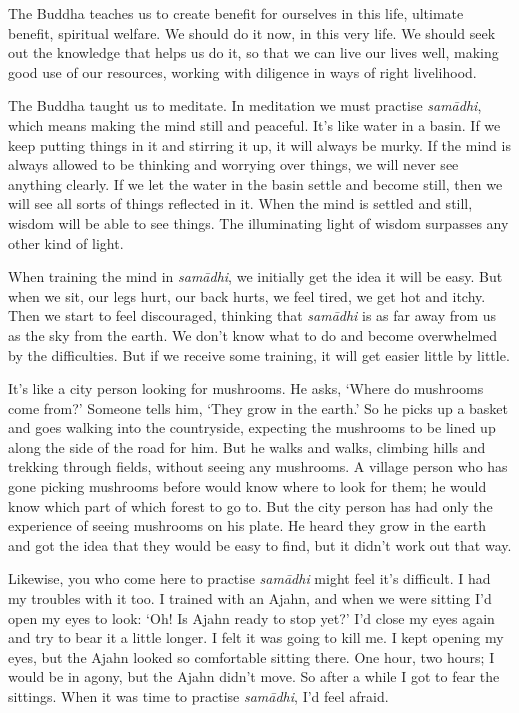The Buddha teaches us to create benefit for ourselves in this life,
ultimate benefit, spiritual welfare. We should do it now, in this very
life. We should seek out the knowledge that helps us do it, so that we
can live our lives well, making good use of our resources, working with
diligence in ways of right livelihood.

The Buddha taught us to meditate. In meditation we must practise
\emph{samādhi}, which means making the mind still and peaceful. It's
like water in a basin. If we keep putting things in it and stirring it
up, it will always be murky. If the mind is always allowed to be
thinking and worrying over things, we will never see anything clearly.
If we let the water in the basin settle and become still, then we will
see all sorts of things reflected in it. When the mind is settled and
still, wisdom will be able to see things. The illuminating light of
wisdom surpasses any other kind of light.

When training the mind in \emph{samādhi}, we initially get the idea it
will be easy. But when we sit, our legs hurt, our back hurts, we feel
tired, we get hot and itchy. Then we start to feel discouraged, thinking
that \emph{samādhi} is as far away from us as the sky from the earth. We
don't know what to do and become overwhelmed by the difficulties. But if
we receive some training, it will get easier little by little.

It's like a city person looking for mushrooms. He asks, `Where do
mushrooms come from?' Someone tells him, `They grow in the earth.' So he
picks up a basket and goes walking into the countryside, expecting the
mushrooms to be lined up along the side of the road for him. But he
walks and walks, climbing hills and trekking through fields, without
seeing any mushrooms. A village person who has gone picking mushrooms
before would know where to look for them; he would know which part of
which forest to go to. But the city person has had only the experience
of seeing mushrooms on his plate. He heard they grow in the earth and
got the idea that they would be easy to find, but it didn't work out
that way.

Likewise, you who come here to practise \emph{samādhi} might feel it's
difficult. I had my troubles with it too. I trained with an Ajahn, and
when we were sitting I'd open my eyes to look: `Oh! Is Ajahn ready to
stop yet?' I'd close my eyes again and try to bear it a little longer. I
felt it was going to kill me. I kept opening my eyes, but the Ajahn
looked so comfortable sitting there. One hour, two hours; I would be in
agony, but the Ajahn didn't move. So after a while I got to fear the
sittings. When it was time to practise \emph{samādhi}, I'd feel afraid.

